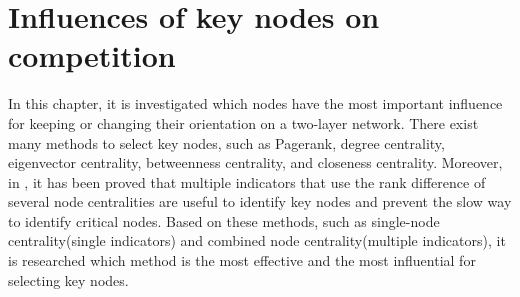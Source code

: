 
\chapter{Influences of key nodes on competition}
\label{chap5}
In this chapter, it is investigated which nodes have the most important influence for keeping or changing their orientation on a two-layer network. There exist many methods to select key nodes, such as Pagerank, degree centrality, eigenvector centrality, betweenness centrality, and closeness centrality. Moreover, in \parencite{mesgari2015, huang2014}, it has been proved that multiple indicators that use the rank difference of several node centralities are useful to identify key nodes and prevent the slow way to identify critical nodes. Based on these methods, such as single-node centrality(single indicators) and combined node centrality(multiple indicators), it is researched which method is the most effective and the most influential for selecting key nodes.  

